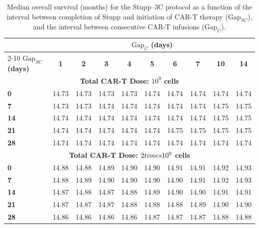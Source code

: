 \begin{table}[ht!]
    \caption{Median overall survival (months) for the Stupp--3C protocol as a function of the interval between completion of Stupp and initiation of CAR-T therapy ($\mathrm{Gap}_{SC}$), and the interval between consecutive CAR-T infusions ($\mathrm{Gap}_{C}$).}
    \label{tab:Stupp-3C-gaps2}
    \centering
    \begin{ruledtabular}
        \begin{tabular}{lccccccccc}
            & \multicolumn{9}{c}{\textbf{$\mathrm{Gap}_{C}$ (days)}} \\
            \cline{2-10}
            \textbf{$\mathrm{Gap}_{SC}$ (days)} & \textbf{1} & \textbf{2} & \textbf{3} & \textbf{4} & \textbf{5} & \textbf{6} & \textbf{7} & \textbf{10} & \textbf{14} \\
            \hline
            \multicolumn{10}{c}{\textbf{Total CAR-T Dose: $10^9$ cells}} \\
            \hline
            \textbf{0}   & 14.73 & 14.73 & 14.73 & 14.73 & 14.74 & 14.74 & 14.74 & 14.74 & 14.74 \\
            \textbf{7}   & 14.73 & 14.73 & 14.74 & 14.74 & 14.74 & 14.74 & 14.74 & 14.75 & 14.75 \\
            \textbf{14}  & 14.74 & 14.74 & 14.74 & 14.74 & 14.74 & 14.74 & 14.74 & 14.75 & 14.75 \\
            \textbf{21}  & 14.74 & 14.74 & 14.74 & 14.74 & 14.74 & 14.75 & 14.75 & 14.75 & 14.75 \\
            \textbf{28}  & 14.74 & 14.74 & 14.74 & 14.74 & 14.74 & 14.74 & 14.74 & 14.74 & 14.74 \\
            \hline
            \multicolumn{10}{c}{\textbf{Total CAR-T Dose: $2\\times10^9$ cells}} \\
            \hline
            \textbf{0}   & 14.88 & 14.88 & 14.89 & 14.90 & 14.90 & 14.91 & 14.91 & 14.92 & 14.93 \\
            \textbf{7}   & 14.88 & 14.89 & 14.90 & 14.90 & 14.90 & 14.90 & 14.91 & 14.92 & 14.93 \\
            \textbf{14}  & 14.87 & 14.88 & 14.87 & 14.88 & 14.89 & 14.90 & 14.90 & 14.91 & 14.91 \\
            \textbf{21}  & 14.87 & 14.87 & 14.87 & 14.88 & 14.88 & 14.88 & 14.89 & 14.90 & 14.90 \\
            \textbf{28}  & 14.86 & 14.86 & 14.86 & 14.86 & 14.87 & 14.87 & 14.87 & 14.88 & 14.88 \\
        \end{tabular}
    \end{ruledtabular}
\end{table}

